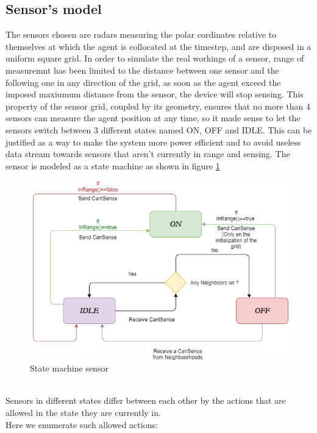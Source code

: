 \documentclass[twocolumn]{article}
\begin{document}
    \subsection*{Sensor's model}
    The sensors chosen are radars measuring the polar cordinates relative to themselves at which the agent is collocated at the timestep, and
    are disposed in a uniform square grid. In order to simulate the real workings of a sensor, range of measuremnt has been limited to the distance
    between one sensor and the following one in any direction of the grid, as soon as the agent exceed the imposed maxiumum distance from the sensor,
    the device will stop sensing.
    This property of the sensor grid, coupled by its geometry, ensures that no more than 4 sensors can measure the agent position at any time,
    so it made sense to let the sensors switch between 3 different states named ON, OFF and IDLE. This can be justified as a way to make the system
    more power efficient and to avoid useless data stream towards sensors that aren't currently in range and sensing.
    The sensor is modeled as a state machine as shown in figure \ref{fig:statemachine}
    \\
    \begin{figure}[h!]
        \centering
        \includegraphics[width=\columnwidth]{sensor_state_machine.png}
        \caption{State machine sensor}
        \label{fig:statemachine}
    \end{figure}
    \\
Sensors in different states differ between each other by the actions that are allowed in the state they are currently in.
\\
Here we enumerate such allowed actions:
\end{document}
